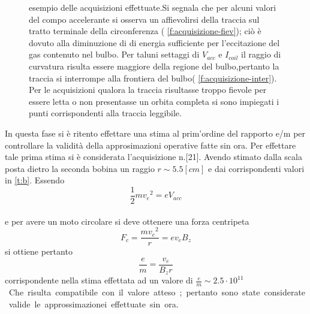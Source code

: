 \begin{figure}[hb]
{		}
		\caption{esempio delle acquisizioni effettuate.Si segnala che per alcuni valori del compo accelerante si osserva un affievolirsi della traccia sul tratto terminale della circonferenza (\figurename{ \ref{f:acquisizione-fiev}}); ciò è dovuto alla diminuzione di \e di energia sufficiente per l'eccitazione del gas contenuto nel bulbo.
		Per taluni settaggi di $V_{acc}$ e $I_{coil}$ il raggio di curvatura risulta essere maggiore della regione del bulbo,pertanto la traccia si interrompe alla frontiera del bulbo(\figurename{ \ref{f:acquisizione-inter}}).
		Per le acquisizioni qualora la traccia risultasse troppo fievole per essere letta o non presentasse un orbita completa si sono impiegati i punti corrispondenti alla traccia leggibile.
		}
		\label{f:acquisizione}
	\end{figure}
	
	
	
	
	
	
	
	 	 
	 
	In questa fase si è ritento effettare una stima al prim'ordine del rapporto e/m
	per controllare la validità della approsimazioni operative fatte sin ora.
	Per effettare tale prima stima si è considerata l'acquisizione n.[21]. Avendo stimato dalla scala posta dietro la seconda bobina un raggio $r\sim 5.5 [cm]$ e dai corrispondenti valori in \tablename{ \ref{t:b}}.
	Essendo 
	\begin{equation}
	\frac{1}{2}m {v_e}^2=e V_{acc}
	\end{equation}\\
	 e per avere un moto circolare si deve ottenere una forza centripeta
	\begin{equation}
		F_c = \frac{m {v_e}^2}{r}= e v_e B_z
	\end{equation}
	si ottiene pertanto
	\begin{equation}
		\frac{e}{m}=\frac{v_e}{B_z r}
	\end{equation}\label{eq:e/m}
	corrispondente nella stima effettata ad un valore di $\frac{e}{m}\sim 2.5 \cdot 10^{11}$\si{\frac{\coulomb}{\kilogram} }.
	Che risulta compatibile con il valore atteso;
	pertanto sono state considerate valide le approssimazionei effettuate sin ora.

